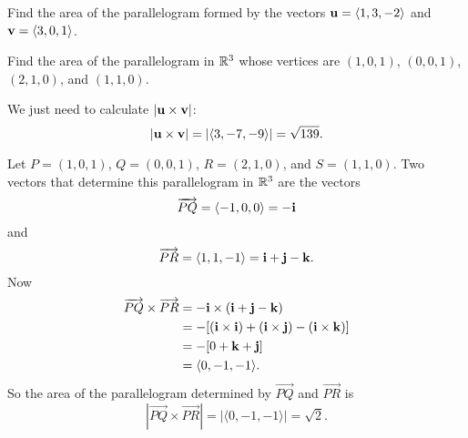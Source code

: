 \begin{activity} \label{A:9.4.4}  
  \ba
  \item Find the area of the parallelogram formed by the vectors $\mathbf{u}
    = \langle 1,3, -2\rangle$ and $\mathbf{v}=\langle 3,0,1\rangle$.
  \item Find the area of the parallelogram in $\mathbb{R}^3$ whose vertices
    are $(1,0,1)$, $(0,0,1)$, 
    $(2,1,0)$, and $(1,1,0)$. 
    \ea
\end{activity}
\begin{smallhint}

\end{smallhint}
\begin{bighint}

\end{bighint}
\begin{activitySolution}
\ba
\item We just need to calculate $|\mathbf{u} \times \mathbf{v}|$:
\[|\mathbf{u} \times \mathbf{v}| = |\langle 3, -7, -9 \rangle| = \sqrt{139}.\]

\item Let $P=(1,0,1)$, $Q=(0,0,1)$, $R=(2,1,0)$, and $S=(1,1,0)$. Two vectors that determine this parallelogram in $\mathbb{R}^3$ are the vectors 
\[\overrightarrow{PQ} = \langle -1, 0, 0 \rangle = -\mathbf{i}\]
and 
\[\overrightarrow{PR} = \langle 1, 1, -1 \rangle = \mathbf{i} + \mathbf{j} - \mathbf{k}.\]
Now
\begin{align*}
\overrightarrow{PQ} \times \overrightarrow{PR} &= -\mathbf{i} \times (\mathbf{i}+\mathbf{j}-\mathbf{k}) \\
	&= -[(\mathbf{i} \times \mathbf{i}) + (\mathbf{i} \times \mathbf{j}) - (\mathbf{i} \times \mathbf{k})] \\
	&= -[0 + \mathbf{k} + \mathbf{j}] \\
	&= \langle 0, -1, -1 \rangle.
\end{align*}
So the area of the parallelogram determined by $\overrightarrow{PQ}$ and $\overrightarrow{PR}$ is 
\[|\overrightarrow{PQ} \times \overrightarrow{PR}| = |\langle 0, -1, -1 \rangle| = \sqrt{2}.\]
\ea

\end{activitySolution}
\aftera
